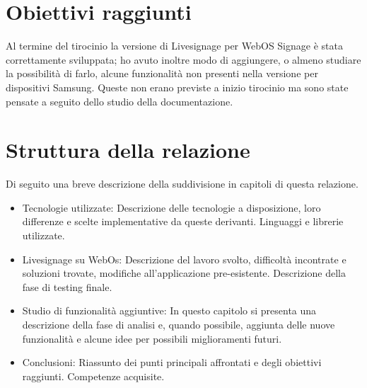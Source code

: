 \section{Obiettivi raggiunti}

Al termine del tirocinio la versione di Livesignage per WebOS Signage è stata correttamente sviluppata; ho avuto inoltre modo di aggiungere, o almeno studiare la possibilità di farlo, alcune funzionalità non presenti nella versione per dispositivi Samsung. Queste non erano previste a inizio tirocinio ma sono state pensate a seguito dello studio della documentazione.

\section{Struttura della relazione}
Di seguito una breve descrizione della suddivisione in capitoli di questa relazione.
\begin{itemize}
    \item Tecnologie utilizzate: Descrizione delle tecnologie a disposizione, loro differenze e scelte implementative da queste derivanti. Linguaggi e librerie utilizzate.
    \item Livesignage su WebOs: Descrizione del lavoro svolto, difficoltà incontrate e soluzioni trovate, modifiche all'applicazione pre-esistente. Descrizione della fase di testing finale.
    \item Studio di funzionalità aggiuntive: In questo capitolo si presenta una descrizione della fase di analisi e, quando possibile, aggiunta delle nuove funzionalità e alcune idee per possibili miglioramenti futuri.
    \item Conclusioni: Riassunto dei punti principali affrontati e degli obiettivi raggiunti. Competenze acquisite.
\end{itemize}